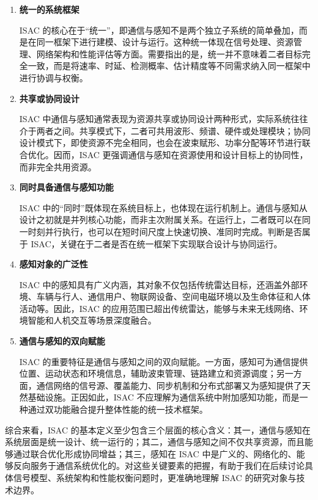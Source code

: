 \begin{enumerate}[label=(\arabic*)]
    \item \textbf{统一的系统框架}
    
    ISAC 的核心在于“统一”，即通信与感知不是两个独立子系统的简单叠加，而是在同一框架下进行建模、设计与运行\cite{Liu2022ISAC,Zhang2021ISAC6G}。这种统一体现在信号处理、资源管理、网络架构和性能评估等方面。需要指出的是，统一并不意味着二者目标完全一致，而是将速率、时延、检测概率、估计精度等不同需求纳入同一框架中进行协调与权衡。
    
    \item \textbf{共享或协同设计}
    
    ISAC 中通信与感知通常表现为资源共享或协同设计两种形式，实际系统往往介于两者之间\cite{Liu2020JointRadarComm,Gonzalez2024integrated}。共享模式下，二者可共用波形、频谱、硬件或处理模块；协同设计模式下，即使资源不完全相同，也会在波束赋形、功率分配等环节进行联合优化。因而，ISAC 更强调通信与感知在资源使用和设计目标上的协同性，而非完全共用资源。
    
    \item \textbf{同时具备通信与感知功能}
    
    ISAC 中的“同时”既体现在系统目标上，也体现在运行机制上\cite{Liu2022ISAC}。通信与感知从设计之初就是并列核心功能，而非主次附属关系。在运行上，二者既可以在同一时刻并行执行，也可以在短时间尺度上快速切换、准同时完成。判断是否属于 ISAC，关键在于二者是否在统一框架下实现联合设计与协同运行。
    
    \item \textbf{感知对象的广泛性}
    
    ISAC 中的感知具有广义内涵，其对象不仅包括传统雷达目标，还涵盖外部环境、车辆与行人、通信用户、物联网设备、空间电磁环境以及生命体征和人体活动等\cite{Liu2022ISAC,Gonzalez2024integrated}。因此，ISAC 的应用范围已超出传统雷达，能够与未来无线网络、环境智能和人机交互等场景深度融合。
    
    \item \textbf{通信与感知的双向赋能}
    
    ISAC 的重要特征是通信与感知之间的双向赋能\cite{Liu2022ISAC,Zhang2021ISAC6G}。一方面，感知可为通信提供位置、运动状态和环境信息，辅助波束管理、链路建立和资源调度；另一方面，通信网络的信号源、覆盖能力、同步机制和分布式部署又为感知提供了天然基础设施。正因如此，ISAC 不应理解为通信系统中附加感知功能，而是一种通过双功能融合提升整体性能的统一技术框架。
\end{enumerate}
综合来看，ISAC 的基本定义至少包含三个层面的核心含义：其一，通信与感知在系统层面是统一设计、统一运行的；其二，通信与感知之间不仅共享资源，而且能够通过联合优化形成协同增益；其三，感知在 ISAC 中是广义的、网络化的、能够反向服务于通信系统优化的。对这些关键要素的把握，有助于我们在后续讨论具体信号模型、系统架构和性能权衡问题时，更准确地理解 ISAC 的研究对象与技术边界\cite{Liu2022ISAC,Liu2020JointRadarComm,Gonzalez2024integrated}。

